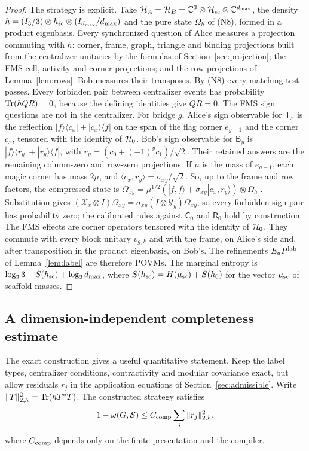 \begin{proof}
The strategy is explicit. Take $\mathcal H_A=\mathcal H_B=\mathbb C^3\otimes\mathcal H_{\rm sc}\otimes\mathbb C^{d_{\max}}$, the density $h=(I_3/3)\otimes h_{\rm sc}\otimes(I_{d_{\max}}/d_{\max})$ and the pure state $\Omega_h$ of (N8), formed in a product eigenbasis. Every synchronized question of Alice measures a projection commuting with $h$: corner, frame, graph, triangle and binding projections built from the centralizer unitaries by the formulas of Section~\ref{sec:projection}; the FMS cell, activity and corner projections; and the row projections of Lemma~\ref{lem:rows}. Bob measures their transposes. By (N8) every matching test passes. Every forbidden pair between centralizer events has probability $\operatorname{Tr}(hQR)=0$, because the defining identities give $QR=0$. The FMS sign questions are not in the centralizer. For bridge $g$, Alice's sign observable for $\mathsf T_x$ is the reflection $|f\rangle\langle c_x|+|c_x\rangle\langle f|$ on the span of the flag corner $e_{g-1}$ and the corner $c_x$, tensored with the identity of $\mathcal H_0$. Bob's sign observable for $\mathsf B_y$ is $|f\rangle\langle r_y|+|r_y\rangle\langle f|$, with $r_y=(c_0+(-1)^yc_1)/\sqrt2$. Their retained answers are the remaining column-zero and row-zero projections. If $\mu$ is the mass of $e_{g-1}$, each magic corner has mass $2\mu$, and $\langle c_x,r_y\rangle=\sigma_{xy}/\sqrt2$. So, up to the frame and row factors, the compressed state is $\Omega_{xy}=\mu^{1/2}(|f,f\rangle+\sigma_{xy}|c_x,r_y\rangle)\otimes\Omega_{h_0}$. Substitution gives $(\mathcal X_x\otimes I)\Omega_{xy}=\sigma_{xy}(I\otimes\mathcal Y_y)\Omega_{xy}$, so every forbidden sign pair has probability zero; the calibrated rules against $\mathsf C_0$ and $\mathsf R_0$ hold by construction. The FMS effects are corner operators tensored with the identity of $\mathcal H_0$. They commute with every block unitary $v_{g,k}$ and with the frame, on Alice's side and, after transposition in the product eigenbasis, on Bob's. The refinements $E_aP^{\rm lab}$ of Lemma~\ref{lem:label} are therefore POVMs. The marginal entropy is $\log_23+S(h_{\rm sc})+\log_2d_{\max}$, where $S(h_{\rm sc})=H(\mu_{\rm sc})+S(h_0)$ for the vector $\mu_{\rm sc}$ of scaffold masses.
\end{proof}

\subsection{A dimension-independent completeness estimate}\label{sec:approxcompiler}
The exact construction gives a useful quantitative statement. Keep the label types, centralizer conditions, contractivity and modular covariance exact, but allow residuals $r_j$ in the application equations of Section~\ref{sec:admissible}. Write $\|T\|_{2,h}^2=\operatorname{Tr}(hT^*T)$. The constructed strategy satisfies
\begin{equation}\label{eq:generalestimate}
 1-\omega(G,\mathcal S)\leq C_{\rm comp}\sum_j\|r_j\|_{2,h}^2,
\end{equation}
where $C_{\rm comp}$ depends only on the finite presentation and the compiler.

